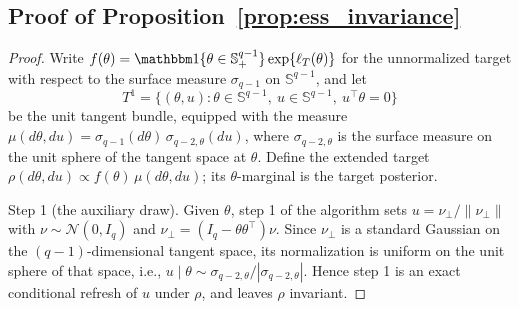 \documentclass[11pt]{article}
\theoremstyle{definition}
\theoremstyle{plain}
\begin{document}
\subsection{Proof of Proposition~\ref{prop:ess_invariance}}\label{proof:prop:ess_invariance}

\begin{proof}
Write $f(\theta)=\mathbbm 1\{\theta\in\mathbb S^{q-1}_+\}\exp\{\ell_T(\theta)\}$ for the unnormalized target with respect to the surface measure $\sigma_{q-1}$ on $\mathbb S^{q-1}$, and let
\[
T^1=\big\{(\theta,u):\theta\in\mathbb S^{q-1},\ u\in\mathbb S^{q-1},\ u^\top\theta=0\big\}
\]
be the unit tangent bundle, equipped with the measure $\mu(d\theta,du)=\sigma_{q-1}(d\theta)\,\sigma_{q-2,\theta}(du)$, where $\sigma_{q-2,\theta}$ is the surface measure on the unit sphere of the tangent space at $\theta$. Define the extended target $\rho(d\theta,du)\propto f(\theta)\,\mu(d\theta,du)$; its $\theta$-marginal is the target posterior.

Step 1 (the auxiliary draw). Given $\theta$, step 1 of the algorithm sets $u=\nu_\perp/\|\nu_\perp\|$ with $\nu\sim\mathcal N(0,I_q)$ and $\nu_\perp=(I_q-\theta\theta^\top)\nu$. Since $\nu_\perp$ is a standard Gaussian on the $(q-1)$-dimensional tangent space, its normalization is uniform on the unit sphere of that space, i.e., $u\mid\theta\sim\sigma_{q-2,\theta}/|\sigma_{q-2,\theta}|$. Hence step 1 is an exact conditional refresh of $u$ under $\rho$, and leaves $\rho$ invariant.


\end{proof}
\end{document}
